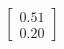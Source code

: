 \documentclass[preview]{standalone}
\begin{document}
\begin{align*}
\begin{bmatrix} 0.51 \\ 0.20 \end{bmatrix}
\end{align*}
\end{document}
